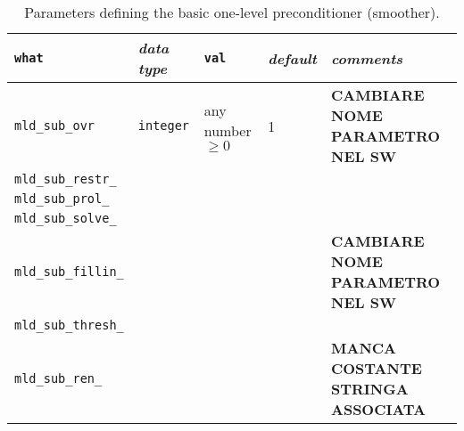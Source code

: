 \begin{sidewaystable}
\begin{center}
\begin{tabular}{|l|l|p{2cm}|l|p{7cm}|}
\hline
\verb|what|              & \emph{data type}        &  \verb|val|      &  \emph{default}  &
\emph{comments} \\ \hline
\verb|mld_sub_ovr|       & \verb|integer|
                         & any number $\ge 0$
                         & 1
                         & \textbf{CAMBIARE NOME PARAMETRO NEL SW}    \\
\verb|mld_sub_restr_|    & 
                         & 
                         &  
                         &     \\
\verb|mld_sub_prol_|     & 
                         & 
                         &
                         &     \\
\verb|mld_sub_solve_|    & 
                         & 
                         &
                         &     \\    
\verb|mld_sub_fillin_|   &
                         &
                         &
                         &     \textbf{CAMBIARE NOME PARAMETRO NEL SW} \\
\verb|mld_sub_thresh_|   &
                         &
                         &
                         &     \\
\verb|mld_sub_ren_|      &
                         &
                         &
                         &  \textbf{MANCA COSTANTE STRINGA ASSOCIATA} \\
\hline

\end{tabular}
\end{center}
\caption{Parameters defining the basic one-level preconditioner (smoother).
\label{tab:p_smoother}}  
\end{sidewaystable}                     
                   
